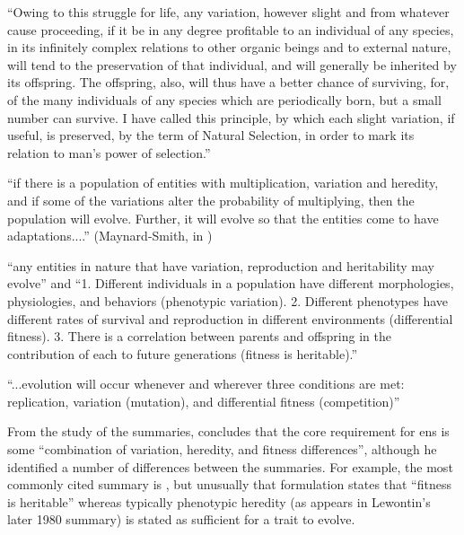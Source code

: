 \begin{compactenum}
\item ``Owing to this struggle for life, any variation, however slight and from whatever cause proceeding, if it be in any degree profitable to an individual of any species, in its infinitely complex relations to other organic beings and to external nature, will tend to the preservation of that individual, and will generally be inherited by its offspring. The offspring, also, will thus have a better chance of surviving, for, of the many individuals of any species which are periodically born, but a small number can survive. I have called this principle, by which each slight variation, if useful, is preserved, by the term of Natural Selection, in order to mark its relation to man's power of selection.'' \cite{Darwin1859}
\item ``if there is a population of entities with multiplication, variation and heredity, and if some of the variations alter the probability of multiplying, then the population will evolve. Further, it will evolve so that the entities come to have adaptations....'' (Maynard-Smith, in \cite{Griesemer2001})
\item ``any entities in nature that have variation, reproduction and heritability may evolve'' \cite{Lewontin:1970mc} and ``1. Different individuals in a population have different morphologies, physiologies, and behaviors (phenotypic variation). 2. Different phenotypes have different rates of survival and reproduction in different environments (differential fitness). 3. There is a correlation between parents and offspring in the contribution of each to future generations (fitness is heritable).'' \cite{Lewontin:1970mc}
\item ``...evolution will occur whenever and wherever three conditions are met: replication, variation (mutation), and differential fitness (competition)'' \parencite[quoting Daniel Dennett]{Ofria2004}
\end{compactenum}

From the study of the summaries, \cite{Godfrey-Smith2007} concludes that the core requirement for \gls{ens} is some ``combination of variation, heredity, and fitness differences'', although he identified a number of differences between the summaries. For example, the most commonly cited summary is \cite{Lewontin:1970mc}, but unusually that formulation states that ``fitness is heritable'' whereas typically phenotypic heredity (as appears in Lewontin's later 1980 summary) is stated as sufficient for a trait to evolve. 

